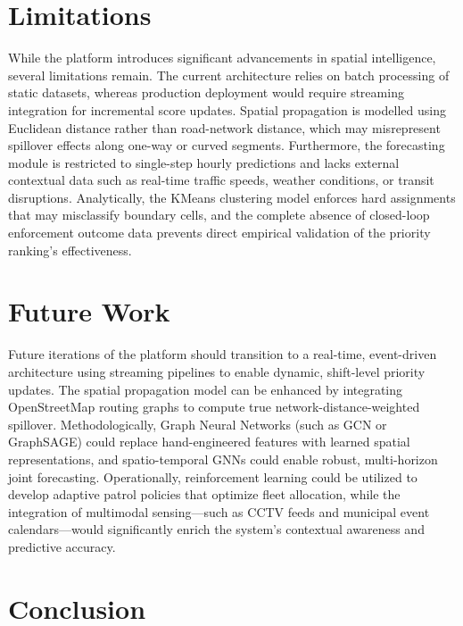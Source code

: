 \documentclass[12pt,a4paper]{article}
\begin{document}
\section{Limitations}

While the platform introduces significant advancements in spatial intelligence, several limitations remain. The current architecture relies on batch processing of static datasets, whereas production deployment would require streaming integration for incremental score updates. Spatial propagation is modelled using Euclidean distance rather than road-network distance, which may misrepresent spillover effects along one-way or curved segments. Furthermore, the forecasting module is restricted to single-step hourly predictions and lacks external contextual data such as real-time traffic speeds, weather conditions, or transit disruptions. Analytically, the KMeans clustering model enforces hard assignments that may misclassify boundary cells, and the complete absence of closed-loop enforcement outcome data prevents direct empirical validation of the priority ranking's effectiveness.


\section{Future Work}

Future iterations of the platform should transition to a real-time, event-driven architecture using streaming pipelines to enable dynamic, shift-level priority updates. The spatial propagation model can be enhanced by integrating OpenStreetMap routing graphs to compute true network-distance-weighted spillover. Methodologically, Graph Neural Networks (such as GCN or GraphSAGE) could replace hand-engineered features with learned spatial representations, and spatio-temporal GNNs could enable robust, multi-horizon joint forecasting. Operationally, reinforcement learning could be utilized to develop adaptive patrol policies that optimize fleet allocation, while the integration of multimodal sensing—such as CCTV feeds and municipal event calendars—would significantly enrich the system's contextual awareness and predictive accuracy.


\section{Conclusion}
\end{document}
